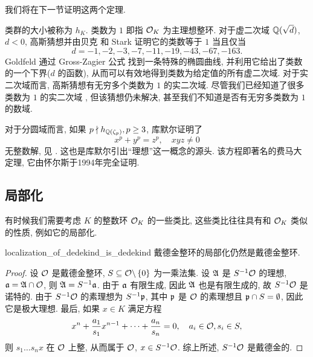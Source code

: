 我们将在下一节证明这两个定理.

类群的大小被称为 $h_K$. 类数为 $1$ 即指 ${\mathcal{O}}_K$ 为主理想整环. 对于虚二次域 ${\mathbb{Q}}(\sqrt{d})$, $d<0$, 高斯猜想并由贝克 \cite[I]{Baker1966} 和 Stark \cite{Stark1967} 证明它的类数等于 $1$ 当且仅当
	\[d=-1,-2,-3,-7,-11,-19,-43,-67,-163.\]
Goldfeld \cite{Goldfeld1985} 通过 Gross-Zagier 公式 \cite{GrossZagier1986} 找到一条特殊的椭圆曲线, 并利用它给出了类数的一个下界($d$ 的函数), 从而可以有效地得到类数为给定值的所有虚二次域.
对于实二次域而言, 高斯猜想有无穷多个类数为 $1$ 的实二次域. 尽管我们已经知道了很多类数为 $1$ 的实二次域 \cite{MollinWilliams1991}, 但该猜想仍未解决, 甚至我们不知道是否有无穷多类数为 $1$ 的数域.

对于分圆域而言, 如果 $p\nmid h_{{\mathbb{Q}}(\zeta_p)},p\ge 3$, 库默尔证明了
	\[x^p+y^p=z^p,\quad xyz\neq 0\]
无整数解, 见 \cite[Chapter 1]{Lang1990}.
这也是库默尔引出``理想''这一概念的源头.
该方程即著名的费马大定理, 它由怀尔斯\cite{TaylorWiles1995, Wiles1995}于1994年完全证明.



\subsection{局部化}

有时候我们需要考虑 $K$ 的整数环 ${\mathcal{O}}_K$ 的一些类比, 这些类比往往具有和 ${\mathcal{O}}_K$ 类似的性质, 例如它的局部化.

\begin{proposition}{}{localization_of_dedekind_is_dedekind}
	戴德金整环的局部化仍然是戴德金整环.
\end{proposition}

\begin{proof}
	设 ${\mathcal{O}}$ 是戴德金整环, $S\subseteq {\mathcal{O}}\backslash\left\{0\right\}$ 为一乘法集. 设 ${\mathfrak{A}}$ 是 $S^{-1}{\mathcal{O}}$ 的理想, ${\mathfrak{a}}={\mathfrak{A}}\cap{\mathcal{O}}$, 则 ${\mathfrak{A}}=S^{-1}{\mathfrak{a}}$. 由于 ${\mathfrak{a}}$ 有限生成, 因此 ${\mathfrak{A}}$ 也是有限生成的, 故 $S^{-1}{\mathcal{O}}$ 是诺特的. 由于 $S^{-1}{\mathcal{O}}$ 的素理想为 $S^{-1}{\mathfrak{p}}$, 其中 ${\mathfrak{p}}$ 是 ${\mathcal{O}}$ 的素理想且 ${\mathfrak{p}}\cap S=\emptyset$, 因此它是极大理想. 最后, 如果 $x\in K$ 满足方程
	\[x^n+\frac{a_1}{s_1}x^{n-1}+\cdots+\frac{a_n}{s_n}=0,\quad a_i\in{\mathcal{O}},s_i\in S,\]
	则 $s_1\dots s_n x$ 在 ${\mathcal{O}}$ 上整, 从而属于 ${\mathcal{O}}$, $x\in S^{-1}{\mathcal{O}}$. 综上所述, $S^{-1}{\mathcal{O}}$ 是戴德金的.
\end{proof}


